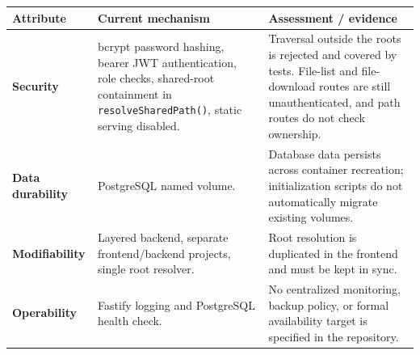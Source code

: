 \documentclass[10pt]{article}
\begin{document}
\begin{tabularx}{\linewidth}{>{\bfseries}p{3.5cm}X X}
Attribute & Current mechanism & Assessment / evidence \\
\hline
Security & bcrypt password hashing, bearer JWT authentication, role checks, shared-root containment in \texttt{resolveSharedPath()}, static serving disabled. &
Traversal outside the roots is rejected and covered by tests. File-list and file-download routes are still unauthenticated, and path routes do not check ownership. \\
Data durability & PostgreSQL named volume. &
Database data persists across container recreation; initialization scripts do not automatically migrate existing volumes. \\
Modifiability & Layered backend, separate frontend/backend projects, single root resolver. &
Root resolution is duplicated in the frontend and must be kept in sync. \\
Operability & Fastify logging and PostgreSQL health check. &
No centralized monitoring, backup policy, or formal availability target is specified in the repository. \\
\end{tabularx}
\end{document}
